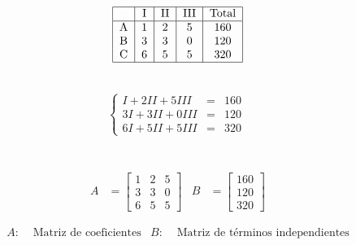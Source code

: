 \documentclass[11pt, a4paper]{article}
\begin{document}
\begin{multicols}{3}
  \\
  \begin{align*}
    \begin{tabular}{|c|c|c|c|c|}
      \hline
      & I & II & III & Total\\
      \hline
      A & 1 & 2 & 5 & 160\\
      B & 3 & 3 & 0 & 120\\
      C & 6 & 5 & 5 & 320\\
      \hline
    \end{tabular}
  \end{align*}
  \begin{align*}
  \end{align*}
  \columnbreak\\
  \vspace{-1cm}
  \begin{align*}
    \left\{
    \begin{array}{rcl}
      I+2II+5III &= &160\\
      3I+3II+0III &= &120\\
      6I+5II+5III &= &320
    \end{array}
    \right.\
  \end{align*}
  \columnbreak\\
  \\
  \begin{align*}
    A &= \begin{bmatrix}
      1 & 2 & 5\\
      3 & 3 & 0\\
      6 & 5 & 5
    \end{bmatrix}&
    B &= \begin{bmatrix}
      160\\
      120\\
      320
    \end{bmatrix}
  \end{align*}
\end{multicols}
\vspace{-1cm}
  \begin{align*}
    A: &\text{ Matriz de coeficientes}&
    B: &\text{ Matriz de términos independientes}
  \end{align*}
    \\\\
\end{document}
